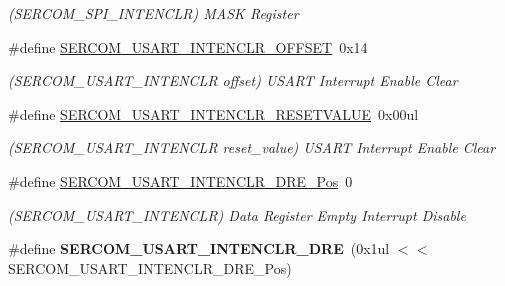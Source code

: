 \begin{DoxyCompactItemize}
\begin{DoxyCompactList}\small\item\em (S\+E\+R\+C\+O\+M\+\_\+\+S\+P\+I\+\_\+\+I\+N\+T\+E\+N\+C\+L\+R) M\+A\+S\+K Register \end{DoxyCompactList}\item 
\hypertarget{group___s_a_m_l21___s_e_r_c_o_m_ga7675caffd8e70928a8f150ecbc832c8d}{}\#define \hyperlink{group___s_a_m_l21___s_e_r_c_o_m_ga7675caffd8e70928a8f150ecbc832c8d}{S\+E\+R\+C\+O\+M\+\_\+\+U\+S\+A\+R\+T\+\_\+\+I\+N\+T\+E\+N\+C\+L\+R\+\_\+\+O\+F\+F\+S\+E\+T}~0x14\label{group___s_a_m_l21___s_e_r_c_o_m_ga7675caffd8e70928a8f150ecbc832c8d}

\begin{DoxyCompactList}\small\item\em (S\+E\+R\+C\+O\+M\+\_\+\+U\+S\+A\+R\+T\+\_\+\+I\+N\+T\+E\+N\+C\+L\+R offset) U\+S\+A\+R\+T Interrupt Enable Clear \end{DoxyCompactList}\item 
\hypertarget{group___s_a_m_l21___s_e_r_c_o_m_gaea5c5e11e08049934b9d34debd92e408}{}\#define \hyperlink{group___s_a_m_l21___s_e_r_c_o_m_gaea5c5e11e08049934b9d34debd92e408}{S\+E\+R\+C\+O\+M\+\_\+\+U\+S\+A\+R\+T\+\_\+\+I\+N\+T\+E\+N\+C\+L\+R\+\_\+\+R\+E\+S\+E\+T\+V\+A\+L\+U\+E}~0x00ul\label{group___s_a_m_l21___s_e_r_c_o_m_gaea5c5e11e08049934b9d34debd92e408}

\begin{DoxyCompactList}\small\item\em (S\+E\+R\+C\+O\+M\+\_\+\+U\+S\+A\+R\+T\+\_\+\+I\+N\+T\+E\+N\+C\+L\+R reset\+\_\+value) U\+S\+A\+R\+T Interrupt Enable Clear \end{DoxyCompactList}\item 
\hypertarget{group___s_a_m_l21___s_e_r_c_o_m_gabf252f5a7ea964a4f199739697aee772}{}\#define \hyperlink{group___s_a_m_l21___s_e_r_c_o_m_gabf252f5a7ea964a4f199739697aee772}{S\+E\+R\+C\+O\+M\+\_\+\+U\+S\+A\+R\+T\+\_\+\+I\+N\+T\+E\+N\+C\+L\+R\+\_\+\+D\+R\+E\+\_\+\+Pos}~0\label{group___s_a_m_l21___s_e_r_c_o_m_gabf252f5a7ea964a4f199739697aee772}

\begin{DoxyCompactList}\small\item\em (S\+E\+R\+C\+O\+M\+\_\+\+U\+S\+A\+R\+T\+\_\+\+I\+N\+T\+E\+N\+C\+L\+R) Data Register Empty Interrupt Disable \end{DoxyCompactList}\item 
\hypertarget{group___s_a_m_l21___s_e_r_c_o_m_ga38ed5c08330853a6bde278cc349ffbb2}{}\#define {\bfseries S\+E\+R\+C\+O\+M\+\_\+\+U\+S\+A\+R\+T\+\_\+\+I\+N\+T\+E\+N\+C\+L\+R\+\_\+\+D\+R\+E}~(0x1ul $<$$<$ S\+E\+R\+C\+O\+M\+\_\+\+U\+S\+A\+R\+T\+\_\+\+I\+N\+T\+E\+N\+C\+L\+R\+\_\+\+D\+R\+E\+\_\+\+Pos)\label{group___s_a_m_l21___s_e_r_c_o_m_ga38ed5c08330853a6bde278cc349ffbb2}


\end{DoxyCompactItemize}
